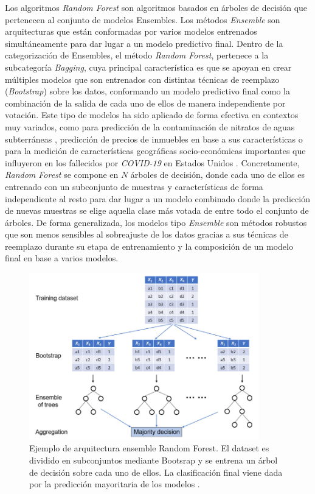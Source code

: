 \documentclass{uathesis-es}
\begin{document}
	
	Los algoritmos \textit{Random Forest} son algoritmos basados en árboles de decisión que pertenecen al conjunto de modelos Ensembles. Los métodos \textit{Ensemble} son arquitecturas que están conformadas por varios modelos entrenados simultáneamente para dar lugar a un modelo predictivo final. Dentro de la categorización de Ensembles, el método \textit{Random Forest}, pertenece a la subcategoría \textit{Bagging}, cuya principal característica es que se apoyan en crear múltiples modelos que son entrenados con distintas técnicas de reemplazo (\textit{Bootstrap}) sobre los datos, conformando un modelo predictivo final como la combinación de la salida de cada uno de ellos de manera independiente por votación. Este tipo de modelos ha sido aplicado de forma efectiva en contextos muy variados, como para predicción de la contaminación de nitratos de aguas subterráneas \cite{HE2022133388}, predicción de precios de inmuebles en base a sus características \cite{ADETUNJI2022806} o para la medición de características geográficas socio-económicas importantes que influyeron en los fallecidos por \textit{COVID-19} en Estados Unidos \cite{GREKOUSIS2022102744}. Concretamente, \textit{Random Forest} se compone en $N$ árboles de decisión, donde cada uno de ellos es entrenado con un subconjunto de muestras y características de forma independiente al resto para dar lugar a un modelo combinado donde la predicción de nuevas muestras se elige aquella clase más votada de entre todo el conjunto de árboles. De forma generalizada, los modelos tipo \textit{Ensemble} son métodos robustos que son menos sensibles al sobreajuste de los datos gracias a sus técnicas de reemplazo durante su etapa de entrenamiento y la composición de un modelo final en base a varios modelos.
	
	
	\begin{figure}[H]
		\centering
		\includegraphics[width=10cm]{Figures/Background/RF.png}
		\caption{Ejemplo de arquitectura ensemble Random Forest. El dataset es dividido en subconjuntos mediante Bootsrap y se entrena un árbol de decisión sobre cada uno de ellos. La clasificación final viene dada por la predicción mayoritaria de los modelos \cite{MISRA2020243}.}
		\label{RF_BACKGROUND}
	\end{figure}
	
\end{document}

